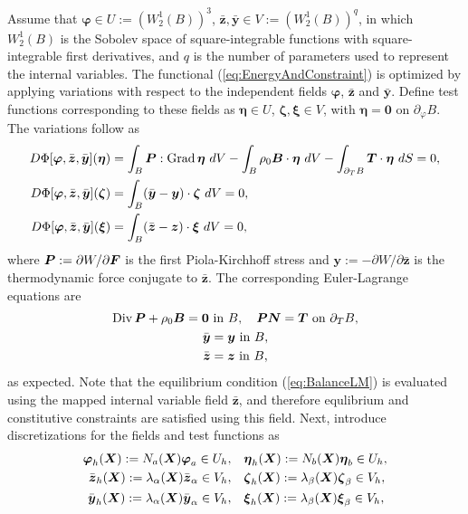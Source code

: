 \documentclass[12pt]{article}
\newcommand{\mbs}[1]{\boldsymbol{#1}}
\def\bP{{\mbs{P}}} \def\bQ{{\mbs{Q}}} \def\bR{{\mbs{R}}}
\def\by{{\mbs{y}}} \def\bz{{\mbs{z}}}
\def\bzeta{{\mbs{\zeta}}}
\def\beeta{{\mbs{\eta}}}
\def\bxi{{\mbs{\xi}}}
\def\bvarphi{{\mbs{\varphi}}}
\DeclareMathOperator{\Div}{Div}
\DeclareMathOperator{\Grad}{Grad}
\begin{document}
Assume that $\bvarphi \in U := (W^1_2(B))^3$, $\bar{\bz}, \bar{\by}
\in V := (W^1_2(B))^q$, in which $W^1_2(B)$ is the Sobolev space of
square-integrable functions with square-integrable first derivatives,
and $q$ is the number of parameters used to represent the internal
variables. The functional (\ref{eq:EnergyAndConstraint}) is optimized
by applying variations with respect to the independent fields
$\bvarphi$, $\bar{\bz}$ and $\bar{\by}$. Define test functions
corresponding to these fields as $\beeta \in U$, $\bzeta, \bxi \in V$,
with $\beeta = \mathbf{0}$ on $\partial_{\varphi}B$. The variations
follow as
\begin{align}\label{eq:Variations-phi}
  D\Phi[ \bvarphi, \bar{\bz}, \bar{\by} ](\beeta)
  & =
  \int_B \bP : \Grad \beeta \ dV - \int_B \rho_0 \bB \cdot \beeta \ dV
  -
  \int_{\partial_T B} \bT \cdot \beeta \ dS = 0,
  \\
  D\Phi[ \bvarphi, \bar{\bz}, \bar{\by} ](\bzeta)
  & =
  \int_B (\bar{\by} - \by) \cdot \bzeta \ dV = 0,
  \label{eq:Variations-Y}
  \\
  D\Phi[ \bvarphi, \bar{\bz}, \bar{\by} ](\bxi)
  & =
  \int_B (\bar{\bz} - \bz) \cdot \bxi \ dV = 0,
  \label{eq:Variations-Z}
\end{align}
where $\bP := \partial W / \partial \bF$ is the first Piola-Kirchhoff
stress and $\by := - \partial W / \partial \bar{\bz}$ is the
thermodynamic force conjugate to $\bar{\bz}$. The corresponding
Euler-Lagrange equations are
\begin{gather}
  \Div \bP + \rho_0 \bB = \mathbf{0} \text{ in } B, \quad
  \bP \bN = \bT \text{ on } \partial_T B, \label{eq:BalanceLM}
  \\
  \bar{\by} = \by \text{ in } B,
  \\
  \bar{\bz} = \bz \text{ in } B,
\end{gather}
as expected. Note that the equilibrium condition (\ref{eq:BalanceLM})
is evaluated using the mapped internal variable field $\bar{\bz}$, and
therefore equlibrium and constitutive constraints are satisfied using
this field. Next, introduce discretizations for the fields and test
functions as
\begin{align}
  \bvarphi_h(\bX) := N_a(\bX) \bvarphi_a \in U_h,
  & \quad
  \beeta_h(\bX) := N_b(\bX) \beeta_b \in U_h,
  \\
  \bar{\bz}_h(\bX) := \lambda_\alpha(\bX) \bar{\bz}_\alpha \in V_h,
  & \quad
  \bzeta_h(\bX) := \lambda_\beta(\bX) \bzeta_\beta \in V_h,
  \\
  \bar{\by}_h(\bX) := \lambda_\alpha(\bX) \bar{\by}_\alpha \in V_h,
  & \quad
  \bxi_h(\bX) := \lambda_\beta(\bX) \bxi_\beta \in V_h,
\end{align}
\end{document}
